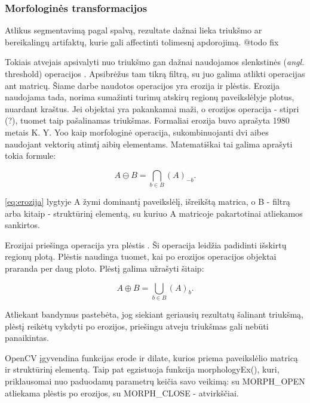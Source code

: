 \documentclass{VUMIFPSbakalaurinis}
\begin{document}
\subsubsection{Morfologinės transformacijos}
Atlikus segmentavimą pagal spalvą, rezultate dažnai lieka triukšmo ar bereikalingų artifaktų, kurie gali affectinti tolimesnį apdorojimą. @todo fix

Tokiais atvejais apsivalyti nuo triukšmo gan dažnai naudojamos slenkstinės (\textit{angl.} threshold) operacijos \cite[112]{SzeliskiCompVision}. Apsibrėžus tam tikrą filtrą, su juo galima atlikti operacijas ant matricų. Šiame darbe naudotos operacijos yra erozija ir plėstis. Erozija naudojama tada, norima sumažinti turimų atskirų regionų paveikslėlyje plotus, nuardant kraštus. Jei objektai yra pakankamai maži, o erozijos operacija - stipri (?), tuomet taip pašalinamas triukšmas. Formaliai erozija buvo aprašyta 1980 metais K. Y. Yoo \cite{4767941} kaip morfologinė operacija, sukombinuojanti dvi aibes naudojant vektorių atimtį aibių elementams. Matematiškai tai galima aprašyti tokia formule: 

\begin{equation}\label{eq:erozija}
	A \ominus B = \bigcap_ {b \in B } (A)_{-b} .
\end{equation}

\ref{eq:erozija} lygtyje A žymi dominantį paveikslėlį, išreikštą matrica, o B - filtrą arba kitaip - struktūrinį elementą, su kuriuo A matricoje pakartotinai atliekamos sankirtos.  

Erozijai priešinga operacija yra plėstis \cite{4767941}. Ši operacija leidžia padidinti išskirtų regionų plotą. Plėstis naudinga tuomet, kai po erozijos operacijos objektai praranda per daug ploto. Plėstį galima užrašyti šitaip:

\begin{equation}\label{eq:plestis}
	A \oplus B = \bigcup_ {b \in B } (A)_{b} .
\end{equation}

Atliekant bandymus pastebėta, jog siekiant geriausių rezultatų šalinant triukšmą, plėstį reikėtų vykdyti po erozijos, priešingu atveju triukšmas gali nebūti panaikintas. 

OpenCV įgyvendina funkcijas erode ir dilate, kurios priema paveikslėlio matricą ir struktūrinį elementą. Taip pat egzistuoja funkcija morphologyEx(), kuri, priklausomai nuo paduodamų parametrų keičia savo veikimą: su MORPH\_OPEN atliekama plėstis po erozijos, su MORPH\_CLOSE - atvirkščiai. 
\end{document}
